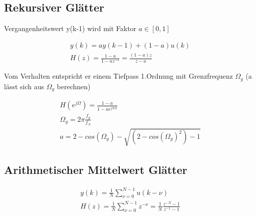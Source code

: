 \documentclass[10pt,a4paper]{article}
\begin{document}
\subsection{Rekursiver Glätter}
Vergangenheitswert y(k-1) wird mit Faktor $a\in [0,1]$
  \begin{mdframed}[style=exercise]
    \begin{align}
        y(k) = ay(k-1)+(1-a)u(k) \\
        H(z) =\frac{1-a}{1-az^{-1}}=\frac{(1-a)z}{z-a}
    \end{align}
  \end{mdframed}
Vom Verhalten entspricht er einem Tiefpass 1.Ordnung mit Grenzfrequenz $\Omega_g$ (a lässt sich aus $\Omega_g$ berechnen)
  \begin{mdframed}[style=exercise]
    \begin{align}
        H(e^{j\Omega}) =\frac{1-a}{1-ae^{j\pi\Omega}}\\
        \Omega_g = 2\pi\frac{f_g}{f_A}\\
        a = 2-cos(\Omega_g)-\sqrt{(2-cos(\Omega_g)^2)-1}
    \end{align}
  \end{mdframed}
\subsection{Arithmetischer Mittelwert Glätter}
  \begin{mdframed}[style=exercise]
    \begin{align}
        y(k)=\frac{1}{N}\sum_{\nu=0}^{N-1} u(k-\nu)\\
        H(z)=\frac{1}{N}\sum_{\nu=0}^{N-1} z^{-\nu} = \frac{1}{N}\frac{z^{-N}-1}{z^{-1}-1}
    \end{align}
  \end{mdframed}
\end{document}
